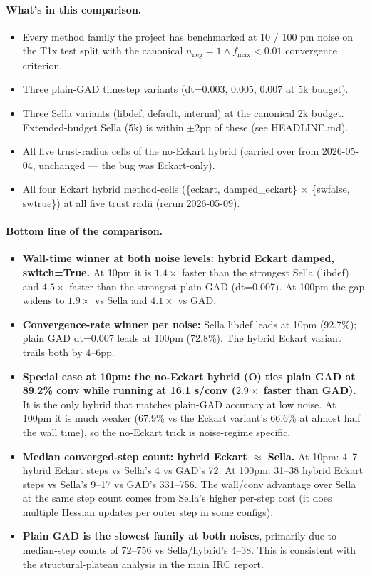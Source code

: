 \documentclass[11pt]{article}
\begin{document}
\paragraph{What's in this comparison.}
\begin{itemize}[leftmargin=1.5em, itemsep=0.05em]
\item Every method family the project has benchmarked at 10 / 100 pm noise on
  the T1x test split with the canonical $n_{\text{neg}}{=}1 \wedge f_{\max}{<}0.01$
  convergence criterion.
\item Three plain-GAD timestep variants (dt=0.003, 0.005, 0.007 at 5k budget).
\item Three Sella variants (libdef, default, internal) at the canonical 2k budget.
  Extended-budget Sella (5k) is within $\pm 2$pp of these (see HEADLINE.md).
\item All five trust-radius cells of the no-Eckart hybrid (carried over from
  2026-05-04, unchanged --- the bug was Eckart-only).
\item All four Eckart hybrid method-cells (\{eckart, damped\_eckart\}
  $\times$ \{swfalse, swtrue\}) at all five trust radii (rerun 2026-05-09).
\end{itemize}

\paragraph{Bottom line of the comparison.}
\begin{itemize}[leftmargin=1.5em]
\item \textbf{Wall-time winner at both noise levels: hybrid Eckart damped, switch=True.}
  At 10pm it is $1.4\times$ faster than the strongest Sella (libdef) and
  $4.5\times$ faster than the strongest plain GAD (dt=0.007). At 100pm
  the gap widens to $1.9\times$ vs Sella and $4.1\times$ vs GAD.
\item \textbf{Convergence-rate winner per noise:} Sella libdef leads at 10pm
  (92.7\%); plain GAD dt=0.007 leads at 100pm (72.8\%). The hybrid Eckart
  variant trails both by 4--6pp.
\item \textbf{Special case at 10pm: the no-Eckart hybrid (O) ties plain GAD
  at 89.2\% conv while running at 16.1 s/conv ($2.9\times$ faster than
  GAD).} It is the only hybrid that matches plain-GAD accuracy at low
  noise. At 100pm it is much weaker (67.9\% vs the Eckart variant's
  66.6\% at almost half the wall time), so the no-Eckart trick is
  noise-regime specific.
\item \textbf{Median converged-step count: hybrid Eckart $\approx$ Sella.}
  At 10pm: 4--7 hybrid Eckart steps vs Sella's 4 vs GAD's 72. At 100pm:
  31--38 hybrid Eckart steps vs Sella's 9--17 vs GAD's 331--756. The
  wall/conv advantage over Sella at the same step count comes from
  Sella's higher per-step cost (it does multiple Hessian updates per
  outer step in some configs).
\item \textbf{Plain GAD is the slowest family at both noises}, primarily
  due to median-step counts of 72--756 vs Sella/hybrid's 4--38. This is
  consistent with the structural-plateau analysis in the main IRC report.
\end{itemize}
\end{document}
